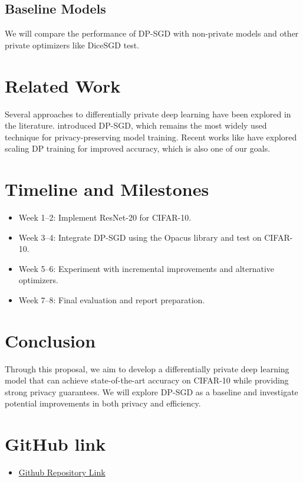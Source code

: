 \documentclass{article}
\begin{document}
    \subsection{Baseline Models}\label{subsec:baseline-models}
    We will compare the performance of DP-SGD with non-private models and other private optimizers like DiceSGD test.


    \section{Related Work}\label{sec:related-work}
    Several approaches to differentially private deep learning have been explored in the literature. \citet{Abadi_2016_DeepLearningDifferentialPrivacy}
    introduced DP-SGD, which remains the most widely used technique for privacy-preserving model training.
    Recent works like \citet{De_2022_ScaleDP_ImageClassification} have explored scaling DP training for improved accuracy, which is also one of our goals.


    \section{Timeline and Milestones}\label{sec:timeline-and-milestones}
    \begin{itemize}
        \item Week 1--2: Implement ResNet-20 for CIFAR-10.
        \item Week 3--4: Integrate DP-SGD using the Opacus library and test on CIFAR-10.
        \item Week 5--6: Experiment with incremental improvements and alternative optimizers.
        \item Week 7--8: Final evaluation and report preparation.
    \end{itemize}


    \section{Conclusion}\label{sec:conclusion}
    Through this proposal, we aim to develop a differentially private deep learning model that can achieve
    state-of-the-art accuracy on CIFAR-10 while providing strong privacy guarantees.
    We will explore DP-SGD as a baseline and investigate potential improvements in both privacy and efficiency.

    
    


    \section*{GitHub link}
    \begin{itemize}
        \item \href{https://github.com/CS8960-Privacy-Preserving-Data-Analysis/final-project}{Github Repository Link}
    \end{itemize}
    
\end{document}

